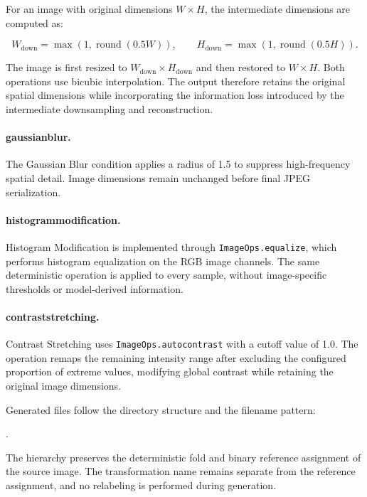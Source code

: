 For an image with original dimensions \(W \times H\), the intermediate
dimensions are computed as:

\begin{equation}
W_{\mathrm{down}}
=
\max\left(1,\operatorname{round}(0.5W)\right),
\qquad
H_{\mathrm{down}}
=
\max\left(1,\operatorname{round}(0.5H)\right).
\end{equation}

The image is first resized to
\(W_{\mathrm{down}} \times H_{\mathrm{down}}\) and then restored to
\(W \times H\). Both operations use bicubic interpolation. The output
therefore retains the original spatial dimensions while incorporating the
information loss introduced by the intermediate downsampling and
reconstruction.

\paragraph{\gls{gaussianblur}.}

The Gaussian Blur condition applies a radius of 1.5 to suppress high-frequency
spatial detail. Image dimensions remain unchanged before final JPEG
serialization.

\paragraph{\gls{histogrammodification}.}

Histogram Modification is implemented through
\texttt{ImageOps.equalize}, which performs histogram equalization on the RGB
image channels. The same deterministic operation is applied to every sample,
without image-specific thresholds or model-derived information.

\paragraph{\gls{contraststretching}.}

Contrast Stretching uses \texttt{ImageOps.autocontrast} with a cutoff value
of 1.0. The operation
remaps the remaining intensity range after excluding the configured proportion
of extreme values, modifying global contrast while retaining the original
image dimensions.

Generated files follow the directory structure
 and the
filename pattern:

.

The hierarchy preserves the deterministic fold and binary reference assignment
of the source image. The transformation name remains separate from the
reference assignment, and no relabeling is performed during generation.

